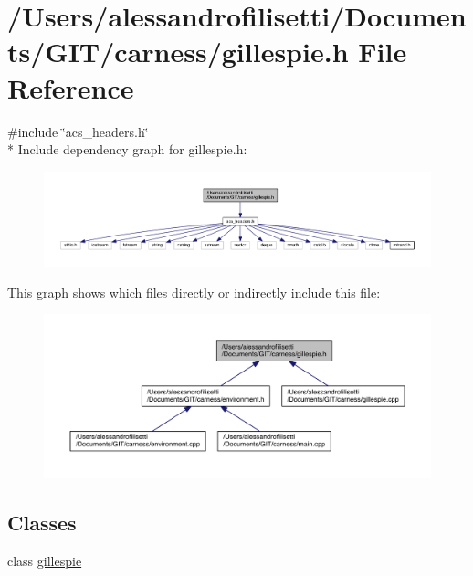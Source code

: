 \hypertarget{a00088}{\section{/\-Users/alessandrofilisetti/\-Documents/\-G\-I\-T/carness/gillespie.h File Reference}
\label{a00088}
}
{\ttfamily \#include \char`\"{}acs\-\_\-headers.\-h\char`\"{}}\\*
Include dependency graph for gillespie.\-h\-:\nopagebreak
\begin{figure}[H]
\begin{center}
\leavevmode
\includegraphics[width=350pt]{a00136}
\end{center}
\end{figure}
This graph shows which files directly or indirectly include this file\-:\nopagebreak
\begin{figure}[H]
\begin{center}
\leavevmode
\includegraphics[width=350pt]{a00137}
\end{center}
\end{figure}
\subsection*{Classes}
\begin{DoxyCompactItemize}
\item 
class \hyperlink{a00015}{gillespie}
\end{DoxyCompactItemize}
